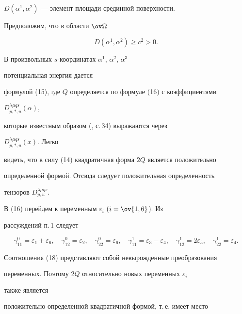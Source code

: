 $D(\alpha^1,\alpha^2)$ --- элемент площади срединной поверхности. 


Предположим, что в области $\ov\Omega$ 


\begin{equation} 


D(\alpha^1,\alpha^2)\ge c^2>0. 


\end{equation} 


 


В произвольных $s$-координатах $\alpha^1$, $\alpha^2$, $\alpha^3$ 


потенциальная энергия дается 


формулой (15), где $Q$ определяется по формуле (16) с коэффициентами 


$D^{\lambda\mu q s}_{p,*,u}(\alpha)$, 


которые известным образом (\cite{1}, с.\,34) выражаются через 


$D^{\lambda\mu q s}_{p,*,u}(x)$. Легко 


видеть, что в силу (14) квадратичная форма $2Q$ является положительно 


определенной формой. Отсюда следует положительная определенность 


тензоров $D^{\lambda\mu q s}_{p,u}$. 


 


В (16) перейдем к переменным $\varepsilon_i$ ($i=\ov{1,6}$). Из 


рассуждений п.\,1 следует 


\begin{equation} 


\gamma^0_{11}=\varepsilon_1+\varepsilon_6,\quad 


\gamma^0_{12}=\varepsilon_2,\quad \gamma^0_{22}=\varepsilon_6, 


\quad \gamma^1_{11}=\varepsilon_3-\varepsilon_4,\quad 


\gamma^1_{12}=2\varepsilon_5,\quad \gamma^1_{22}=\varepsilon_4. 


\end{equation} 


Соотношения (18) представляют собой невырожденные преобразования 


переменных. Поэтому $2Q$ относительно новых переменных $\varepsilon_i$ 


также является 


положительно определенной квадратичной формой, т.\,е. имеет место 


